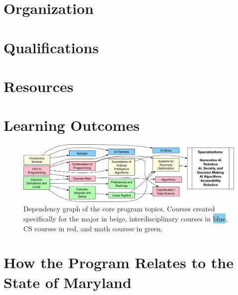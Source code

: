 \documentclass[
10pt, %
a4paper, %
oneside, %
headinclude,footinclude, %
BCOR5mm, %
]{scrartcl}
\begin{document}



\section{Organization}


\section{Qualifications}



\section{Resources}




\section{Learning Outcomes}
\label{sec:learning-outcomes}



\begin{figure}

  \includegraphics[width=1.2\linewidth]{figures/dependency}
  \caption{Dependency graph of the core program topics.  Courses created specifically for the \ai{} major in \colorbox{yellow!30}{beige}, interdisciplinary courses in \colorbox{SkyBlue}{blue}, CS courses in \colorbox{red!30}{red}, and math courses in \colorbox{green!30}{green}.}
\end{figure}




\section{How the Program Relates to the State of Maryland}
\end{document}
